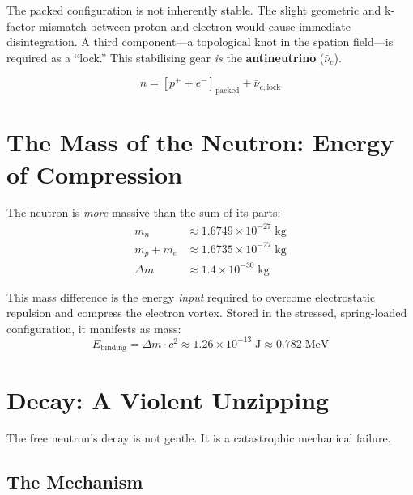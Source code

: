 The packed configuration is not inherently stable.  The slight geometric and k-factor mismatch between proton and electron would cause immediate disintegration.  A third component---a topological knot in the spation field---is required as a ``lock.''  This stabilising gear \emph{is} the \textbf{antineutrino} ($\bar{\nu}_e$).

\begin{equation}\label{eq:neutron}
  n = [p^+ + e^-]_{\text{packed}} + \bar{\nu}_{e,\text{lock}}
\end{equation}


\section{The Mass of the Neutron: Energy of Compression}

The neutron is \emph{more} massive than the sum of its parts:
\begin{align}
  m_n &\approx 1.6749 \times 10^{-27}\;\text{kg} \\
  m_p + m_e &\approx 1.6735 \times 10^{-27}\;\text{kg} \\
  \Delta m &\approx 1.4 \times 10^{-30}\;\text{kg}
\end{align}

This mass difference is the energy \emph{input} required to overcome electrostatic repulsion and compress the electron vortex.  Stored in the stressed, spring-loaded configuration, it manifests as mass:
\begin{equation}\label{eq:binding}
  E_{\text{binding}} = \Delta m \cdot c^2 \approx 1.26 \times 10^{-13}\;\text{J} \approx 0.782\;\text{MeV}
\end{equation}


\section{Decay: A Violent Unzipping}

The free neutron's decay is not gentle.  It is a catastrophic mechanical failure.

\subsection{The Mechanism}

